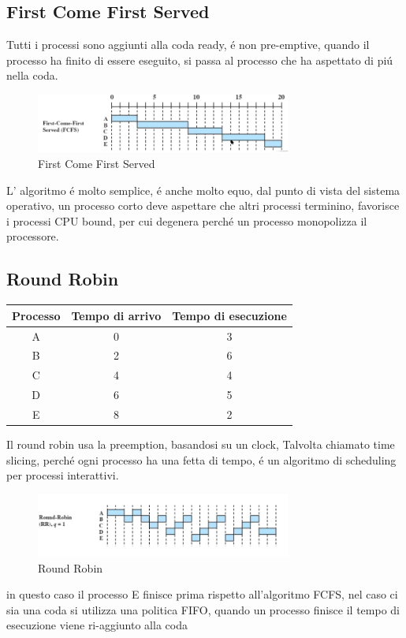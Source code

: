 \documentclass[11pt]{article}
\begin{document}
    \subsection{First Come First Served}
    Tutti i processi sono aggiunti alla coda ready, é non pre-emptive, quando il processo ha finito di essere eseguito, si passa
    al processo che ha aspettato di piú nella coda.
    \begin{figure}[H]
        \centering
        \includegraphics[width=0.75\textwidth]{immagini/FCFS}
        \caption{First Come First Served}
    \end{figure}
    L' algoritmo é molto semplice, é anche molto equo, dal punto di vista del sistema operativo, un processo corto
    deve aspettare che altri processi terminino, favorisce i processi CPU bound, per cui degenera perché un processo 
    monopolizza il processore.
    \subsection{Round Robin}
        \begin{table}[H]
        \raggedright
        \begin{tabular}{|c|c|c|}
            \hline
            \textbf{Processo} & \textbf{Tempo di arrivo} & \textbf{Tempo di esecuzione} \\
            \hline
            A & 0 & 3   \\
            \hline
            B & 2 & 6 \\
            \hline
            C & 4 & 4  \\
            \hline
            D & 6 & 5  \\
            \hline
            E & 8 & 2  \\
            \hline
        \end{tabular}
    \end{table}
    Il round robin usa la preemption, basandosi su un clock, Talvolta chiamato time slicing, perché ogni processo
    ha una fetta di tempo, é un algoritmo di scheduling per processi interattivi.
    \begin{figure}[H]
        \centering
        \includegraphics[width=0.75\textwidth]{immagini/RoundRobin}
        \caption{Round Robin}
    \end{figure}
    in questo caso il processo E finisce prima rispetto all'algoritmo FCFS, nel
    caso ci sia una coda si utilizza una politica FIFO, quando un processo finisce il tempo di esecuzione viene ri-aggiunto alla coda
\end{document}
